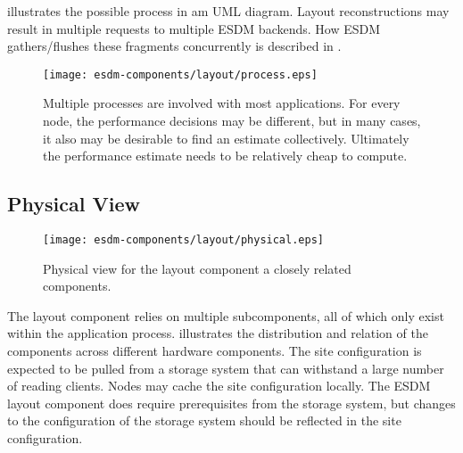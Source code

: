  illustrates the possible process in am UML diagram.
Layout reconstructions may result in multiple requests to multiple ESDM backends.
How ESDM gathers/flushes these fragments concurrently is described in .


\begin{figure}
	\centering
	\texttt{[image: esdm-components/layout/process.eps]}
	\caption{Multiple processes are involved with most applications. For every node, the performance decisions may be different, but in many cases, it also may be desirable to find an estimate collectively. Ultimately the performance estimate needs to be relatively cheap to compute. }
	\label{fig:esdm layout process view}
\end{figure}





\subsection{Physical View}

\begin{figure}
	\centering
	\texttt{[image: esdm-components/layout/physical.eps]}
	\caption{Physical view for the layout component a closely related components.}
	\label{fig:esdm layout  physical view}
\end{figure}

The layout component relies on multiple subcomponents, all of which only exist within the application process.
 illustrates the distribution and relation of the components across different hardware components.
The site configuration is expected to be pulled from a storage system that can withstand a large number of reading clients.
Nodes may cache the site configuration locally.
The ESDM layout component does require prerequisites from the storage system, but changes to the configuration of the storage system should be reflected in the site configuration.


%
